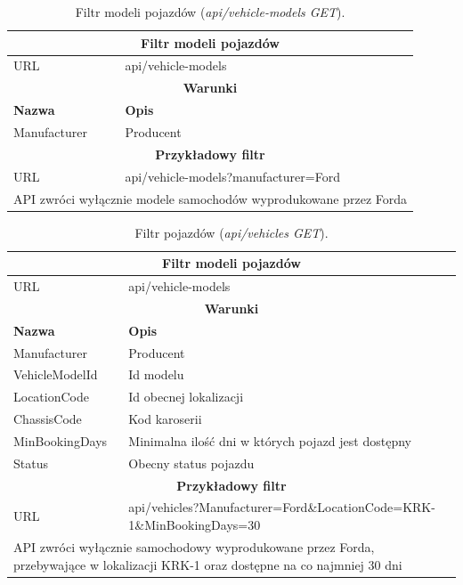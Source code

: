 \documentclass[eng,printmode,openany]{mgr}
\begin{document}
	\begin{table}[H]
		\caption{Filtr modeli pojazdów (\textit{api/vehicle-models GET}).}
		\begin{tabularx}{\textwidth}{|l|X|}
			\hline                                       							
			\multicolumn{2}{|c|}{\textbf{Filtr modeli pojazdów}}  							        \\ \hline
			URL                 & api/vehicle-models     							             	\\ \hline
			\multicolumn{2}{|c|}{\textbf{Warunki}}     												\\ \hline
			\textbf{Nazwa}      & \textbf{Opis}              										\\ \hline
			Manufacturer        & Producent         												\\ \hline
			\multicolumn{2}{|c|}{\textbf{Przykładowy filtr}}										\\ \hline
			URL                 & api/vehicle-models?manufacturer=Ford								\\ \hline
			\multicolumn{2}{|l|}{API zwróci wyłącznie modele samochodów wyprodukowane przez Forda}	\\ \hline
		\end{tabularx}
	\end{table}
	
	\begin{table}[H]
		\caption{Filtr pojazdów (\textit{api/vehicles GET}).}
		\begin{tabularx}{\textwidth}{|l|X|}
			\hline                                       							
			\multicolumn{2}{|c|}{\textbf{Filtr modeli pojazdów}}  							        	\\ \hline
			URL                 & api/vehicle-models     							             		\\ \hline
			\multicolumn{2}{|c|}{\textbf{Warunki}}     													\\ \hline
			\textbf{Nazwa}      & \textbf{Opis}              											\\ \hline
			Manufacturer        & Producent         													\\ \hline
			VehicleModelId      & Id modelu	        													\\ \hline
			LocationCode        & Id obecnej lokalizacji												\\ \hline
			ChassisCode         & Kod karoserii 	  													\\ \hline
			MinBookingDays      & Minimalna ilość dni w których pojazd jest dostępny					\\ \hline
			Status              & Obecny status pojazdu         										\\ \hline										
			\multicolumn{2}{|c|}{\textbf{Przykładowy filtr}}											\\ \hline
			URL                 & api/vehicles?Manufacturer=Ford\&LocationCode=KRK-1\&MinBookingDays=30	\\ \hline
			\multicolumn{2}{|X|}{API zwróci wyłącznie samochodowy wyprodukowane przez Forda, przebywające w lokalizacji KRK-1 oraz dostępne na co najmniej 30 dni}		\\ \hline
		\end{tabularx}
	\end{table}
	
\end{document}
